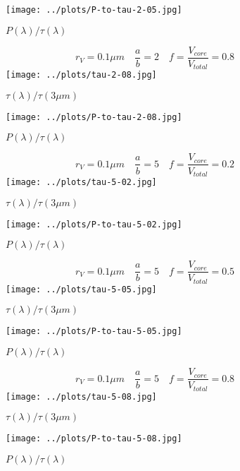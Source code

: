 \documentclass[a4paper,10pt]{article}
\begin{document}
\begin{figure}[p]
 \texttt{[image: ../plots/P-to-tau-2-05.jpg]}
 \caption{$P(\lambda)/\tau(\lambda)$ }
\end{figure}

\begin{figure}[p]
$$r_V = 0.1 \mu m \quad \frac{a}{b} = 2 \quad f=\frac{V_{core}}{V_{total}}=0.8$$
 \texttt{[image: ../plots/tau-2-08.jpg]}
 \caption{$\tau(\lambda)/\tau(3\mu m)$ }
\end{figure}

\begin{figure}[p]
 \texttt{[image: ../plots/P-to-tau-2-08.jpg]}
 \caption{$P(\lambda)/\tau(\lambda)$ }
\end{figure}

\begin{figure}[p]
$$r_V = 0.1 \mu m \quad \frac{a}{b} = 5 \quad f=\frac{V_{core}}{V_{total}}=0.2$$
 \texttt{[image: ../plots/tau-5-02.jpg]}
 \caption{$\tau(\lambda)/\tau(3\mu m)$ }
\end{figure}

\begin{figure}[p]
 \texttt{[image: ../plots/P-to-tau-5-02.jpg]}
 \caption{$P(\lambda)/\tau(\lambda)$ }
\end{figure}


\begin{figure}[p]
 $$r_V = 0.1 \mu m \quad \frac{a}{b} = 5 \quad f=\frac{V_{core}}{V_{total}}=0.5$$
 \texttt{[image: ../plots/tau-5-05.jpg]}
 \caption{$\tau(\lambda)/\tau(3\mu m)$ }
\end{figure}

\begin{figure}[p]
 \texttt{[image: ../plots/P-to-tau-5-05.jpg]}
 \caption{$P(\lambda)/\tau(\lambda)$ }
\end{figure}

\begin{figure}[p]
$$r_V = 0.1 \mu m \quad \frac{a}{b} = 5 \quad f=\frac{V_{core}}{V_{total}}=0.8$$
 \texttt{[image: ../plots/tau-5-08.jpg]}
 \caption{$\tau(\lambda)/\tau(3\mu m)$ }
\end{figure}

\begin{figure}[p]
 \texttt{[image: ../plots/P-to-tau-5-08.jpg]}
 \caption{$P(\lambda)/\tau(\lambda)$ }
\end{figure}

\end{document}
